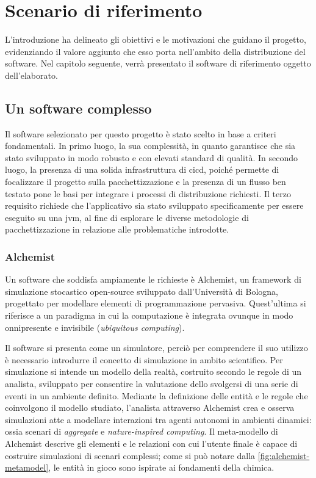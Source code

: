 
\chapter{Scenario di riferimento}\label{chap:scenery}

L'introduzione ha delineato gli obiettivi e le motivazioni che guidano il progetto, evidenziando il valore aggiunto che esso porta nell'ambito della distribuzione del software. Nel capitolo seguente, verrà presentato il software di riferimento oggetto dell'elaborato.

\section{Un software complesso}\label{sec:alchemist}
Il software selezionato per questo progetto è stato scelto in base a criteri fondamentali. In primo luogo, la sua complessità, in quanto garantisce che sia stato sviluppato in modo robusto e con elevati standard di qualità. In secondo luogo, la presenza di una solida infrastruttura di \ac{cicd}, poiché permette di focalizzare il progetto sulla pacchettizzazione e la presenza di un flusso ben testato pone le basi per integrare i processi di distribuzione richiesti. Il terzo requisito richiede che l'applicativo sia stato sviluppato specificamente per essere eseguito su una \ac{jvm}, al fine di esplorare le diverse metodologie di pacchettizzazione in relazione alle problematiche introdotte.

\subsection{Alchemist}

Un software che soddisfa ampiamente le richieste è Alchemist\cite{Pianini_2013}, un framework di simulazione stocastico open-source sviluppato dall'Università di Bologna, progettato per modellare elementi di programmazione pervasiva. Quest'ultima si riferisce a un paradigma in cui la computazione è integrata ovunque in modo onnipresente e invisibile (\textit{ubiquitous computing}). 


Il software si presenta come un simulatore, perciò per comprendere il suo utilizzo è necessario introdurre il concetto di simulazione in ambito scientifico. Per simulazione si intende un modello della realtà, costruito secondo le regole di un analista, sviluppato per consentire la valutazione dello svolgersi di una serie di eventi in un ambiente definito. Mediante la definizione delle entità e le regole che coinvolgono il modello studiato, l'analista attraverso Alchemist crea e osserva simulazioni atte a modellare interazioni tra agenti autonomi in ambienti dinamici: ossia scenari di \textit{aggregate} e \textit{nature-inspired computing}. Il meta-modello di Alchemist descrive gli elementi e le relazioni con cui l'utente finale è capace di costruire simulazioni di scenari complessi; come si può notare dalla \cref{fig:alchemist-metamodel}, le entità in gioco sono ispirate ai fondamenti della chimica. 

